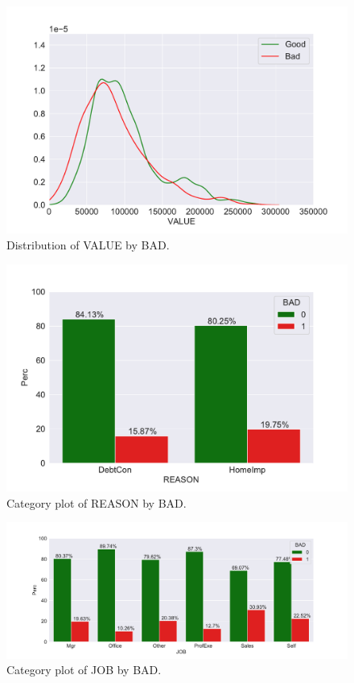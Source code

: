 \begin{figure}[!ht]
	\centering
	\includegraphics[scale=0.40]{figs/value_dist.pdf}
	\caption{Distribution of VALUE by BAD. \label{value_dist}}
\end{figure}

\begin{figure}[!ht]
	\centering
	\includegraphics[scale=0.40]{figs/reason_cat.pdf}
	\caption{Category plot of REASON by BAD. \label{reason_cat}}
\end{figure}

\begin{figure}[!ht]
	\centering
	\includegraphics[scale=0.40]{figs/job_cat.pdf}
	\caption{Category plot of JOB by BAD. \label{job_cat}}
\end{figure}


